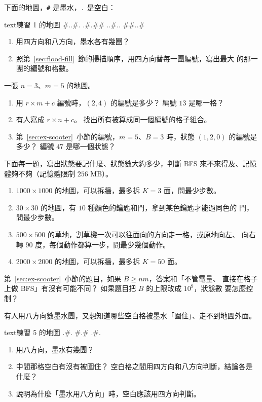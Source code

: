 \begin{drills}[label=drills:ch12]
\item 下面的地圖，\texttt{\#} 是墨水，\texttt{.} 是空白：
\begin{code}{text}{練習 1 的地圖}
#..#.
.#.##
..#..
##..#
\end{code}
\begin{enumerate}
\item 用四方向和八方向，墨水各有幾團？
\item 照第~\ref{sec:flood-fill}~節的掃描順序，用四方向替每一團編號，寫出最大
的那一團的編號和格數。
\end{enumerate}

\item 一張 $n = 3$、$m = 5$ 的地圖。
\begin{enumerate}
\item 用 $r \times m + c$ 編號時，$(2, 4)$ 的編號是多少？ 編號 $13$ 是哪一格？
\item 有人寫成 $r \times n + c$。 找出所有被算成同一個編號的格子組合。
\item 第~\ref{sec:ex-scooter}~小節的編號，$m = 5$、$B = 3$ 時，狀態
$(1, 2, 0)$ 的編號是多少？ 編號 $47$ 是哪一個狀態？
\end{enumerate}

\item 下面每一題，寫出狀態要記什麼、狀態數大約多少，判斷 BFS 來不來得及、記憶
體夠不夠（記憶體限制 $256$ MB）。
\begin{enumerate}
\item $1000 \times 1000$ 的地圖，可以拆牆，最多拆 $K = 3$ 面，問最少步數。
\item $30 \times 30$ 的地圖，有 $10$ 種顏色的鑰匙和門，拿到某色鑰匙才能過同色的
門，問最少步數。
\item $500 \times 500$ 的草地，割草機一次可以往面向的方向走一格，或原地向左、
向右轉 $90$ 度，每個動作都算一步，問最少幾個動作。
\item $2000 \times 2000$ 的地圖，可以拆牆，最多拆 $K = 50$ 面。
\end{enumerate}

\item 第~\ref{sec:ex-scooter}~小節的題目，如果 $B \ge nm$，答案和「不管電量、
直接在格子上做 BFS」有沒有可能不同？ 如果題目把 $B$ 的上限改成 $10^9$，狀態數
要怎麼控制？

\item 有人用八方向數墨水團，又想知道哪些空白格被墨水「圍住」、走不到地圖外面。
\begin{code}{text}{練習 5 的地圖}
.#.
#.#
.#.
\end{code}
\begin{enumerate}
\item 用八方向，墨水有幾團？
\item 中間那格空白有沒有被圍住？ 空白格之間用四方向和八方向判斷，結論各是什麼？
\item 說明為什麼「墨水用八方向」時，空白應該用四方向判斷。
\end{enumerate}


\end{drills}

